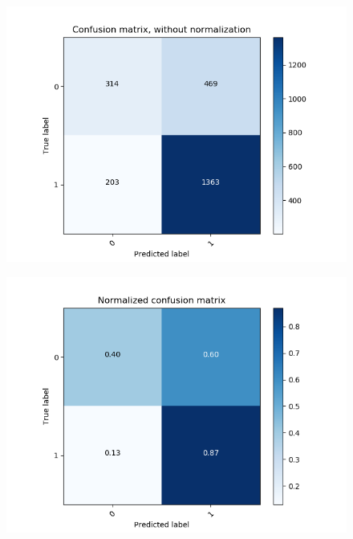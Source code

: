 \begin{figure}
	\centering
	\begin{minipage}[b]{0.45\columnwidth}
	\centering
	\includegraphics[clip, width=\linewidth]{fig/chapter4/count_pretrain_False_he_False}
	\label{fig:count_no_preprocess}
    \end{minipage}
	\begin{minipage}[b]{0.45\columnwidth}
		\centering
		\includegraphics[clip, width=\linewidth]{fig/chapter4/pretrain_False_he_False}
		\label{fig: no_preprocess}
	\end{minipage}
	\begin{minipage}[b]{0.45\columnwidth}

\end{minipage}
\end{figure}
